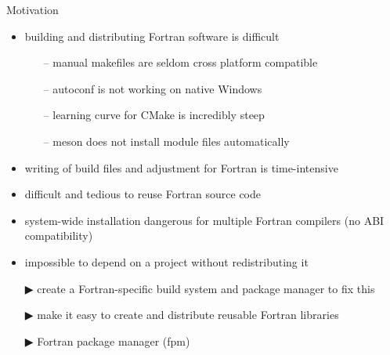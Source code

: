 \documentclass[lualatex,10pt,aspectratio=169]{beamer}
\begin{document}
\begin{frame}{Motivation}
   \begin{itemize}
      \item building and distributing Fortran software is difficult
         \begin{itemize}
            \item[--] manual makefiles are seldom cross platform compatible
            \item[--] autoconf is not working on native Windows
            \item[--] learning curve for CMake is incredibly steep
            \item[--] meson does not install module files automatically
         \end{itemize}
      \item writing of build files and adjustment for Fortran is time-intensive
      \item difficult and tedious to reuse Fortran source code
      \item system-wide installation dangerous for multiple Fortran compilers
         (no ABI compatibility)
      \item impossible to depend on a project without redistributing it
         \\[2ex]
      \item[\alert{▶}] create a \alert{Fortran-specific} build system and package manager to fix this
      \item[\alert{▶}] make it easy to create and distribute \alert{reusable} Fortran libraries
      \item[\alert{▶}] Fortran package manager (\alert{fpm})
   \end{itemize}
\end{frame}
\end{document}

